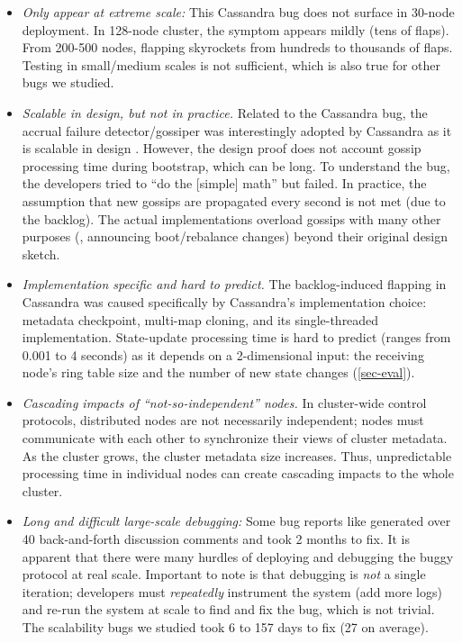 \begin{itemize}
\item {\em Only appear at extreme scale:} This Cassandra bug does not surface
in 30-node deployment.  In 128-node cluster, the symptom appears mildly (tens
of flaps). From 200-500 nodes, flapping skyrockets from hundreds to thousands
of flaps. Testing in small/medium scales is not sufficient, which is also true
for other bugs we studied.

\item {\em Scalable in design, but not in practice.}  Related to the Cassandra
bug, the accrual failure detector/gossiper
\cite{Hayashibara+04-PhiFailureDetector} was interestingly adopted by Cassandra
as it is scalable in design \cite{Lakshman+09-Cassandra}.  However, the design
proof does not account gossip processing time during bootstrap, which can be
long.  To understand the bug, the developers tried to ``do the [simple] math''
\cite{CA-One} but failed.  In practice, the assumption that new gossips are
propagated every second is not met (due to the backlog).  The actual
implementations overload gossips with many other purposes (\eg, announcing
boot/rebalance changes) beyond their original design sketch.

\item {\em Implementation specific and hard to predict.}  The backlog-induced
flapping in Cassandra was caused specifically by Cassandra's implementation
choice: metadata checkpoint, multi-map cloning, and its single-threaded
implementation.  State-update processing time is hard to predict (ranges from
0.001 to 4 seconds) as it depends on a 2-dimensional input: the receiving node's
ring table size and the number of new state changes (\sec\ref{sec-eval}).


\item {\em Cascading impacts of ``not-so-independent'' nodes.}  In 
cluster-wide control protocols, distributed nodes are  not
necessarily independent; nodes must communicate with each other
to synchronize their views of cluster metadata.  As the cluster grows, the
cluster metadata size increases.  Thus, unpredictable processing time in
individual nodes can create cascading impacts to the whole cluster.

% 
\item {\em Long and difficult large-scale debugging:} 
%
Some bug reports like \caone generated over 40 back-and-forth discussion
comments and took 2 months to fix.  It is apparent \cite{CA-One} that
there were many hurdles of deploying and debugging the buggy protocol at
real scale.  Important to note is that debugging is {\em not} a single
iteration; developers must {\em repeatedly} instrument the system (add
more logs) and re-run the system at scale to find and fix the bug, which
is not trivial.  The scalability bugs we studied took 6 to 157 days to
fix (27 on average).



\end{itemize}
